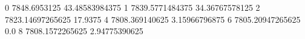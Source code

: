 0 7848.6953125 43.48583984375
1 7839.5771484375 34.36767578125
2 7823.14697265625 17.9375
4 7808.369140625 3.15966796875
6 7805.20947265625 0.0
8 7808.1572265625 2.94775390625
